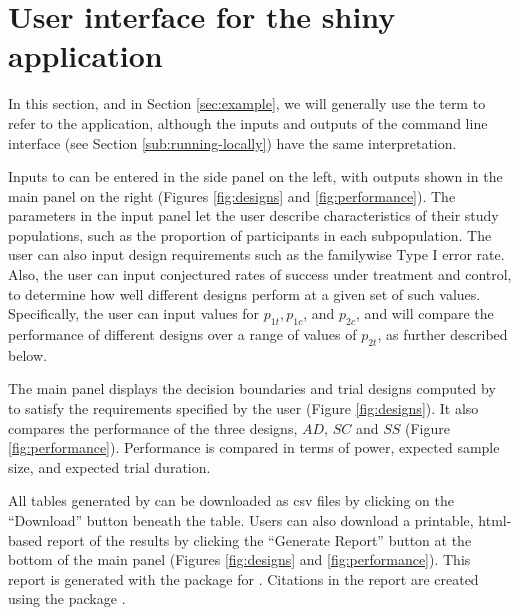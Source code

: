 \documentclass[article]{jss}
\begin{document}
\section{User interface for the shiny application}
\label{sec:UI}

In this section, and in Section \ref{sec:example}, we will generally use the term  to refer to the   application, although the inputs and outputs of the command line interface (see Section \ref{sub:running-locally}) have the same interpretation.

Inputs to  can be entered in the side panel on the left, with outputs shown in the main panel on the right (Figures \ref{fig:designs} and \ref{fig:performance}). The parameters in the input panel let the user describe characteristics of their study populations, such as the proportion of participants in each subpopulation. 
The user can also input design requirements such as  the  familywise Type I error rate. Also, the user can input conjectured rates of success under treatment and control, to determine how well different designs perform at a given set of such values. Specifically, the user can input values for $p_{1t},p_{1c}$, and $p_{2c}$, and   will compare the performance of different designs  over a range of values of $p_{2t}$, as further described below.

The main panel displays the decision boundaries and trial designs  computed by  to satisfy the requirements specified by the user  (Figure \ref{fig:designs}). It also compares the performance of the three designs, $AD$, $SC$ and $SS$ (Figure \ref{fig:performance}). Performance is compared in terms of power, expected sample size, and expected trial duration.

All tables generated by  can be downloaded as csv files by clicking on the ``Download'' button beneath the table. Users can also download a printable, html-based report of the results by clicking the ``Generate Report'' button at the bottom of the main panel (Figures \ref{fig:designs} and \ref{fig:performance}). This report is generated with the  package for  \citep{knitr}. Citations in the report are created using the  package \citep{knitcitations}.
\end{document}
